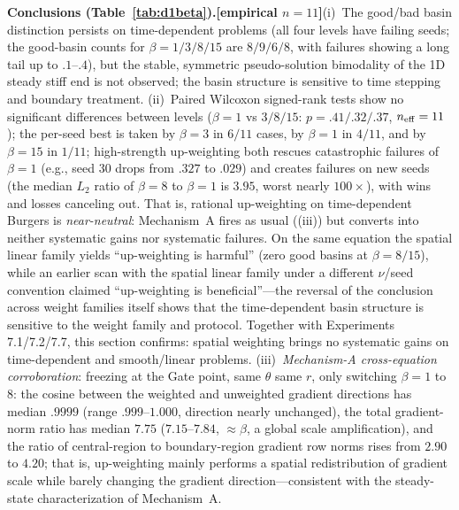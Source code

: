 \documentclass[11pt]{article}
\numberwithin{equation}{section}
\begin{document}
\noindent\textbf{Conclusions (Table~\ref{tab:d1beta}).}\textbf{[empirical $n=11$]}(i)~The good/bad basin distinction persists on time-dependent problems (all four levels have failing seeds; the good-basin counts for $\beta=1/3/8/15$ are $8/9/6/8$, with failures showing a long tail up to $.1$--$.4$), but the stable, symmetric pseudo-solution bimodality of the 1D steady stiff end is not observed; the basin structure is sensitive to time stepping and boundary treatment. (ii)~Paired Wilcoxon signed-rank tests show no significant differences between levels ($\beta=1$ vs $3/8/15$: $p=.41/.32/.37$, $n_{\rm eff}=11$); the per-seed best is taken by $\beta=3$ in $6/11$ cases, by $\beta=1$ in $4/11$, and by $\beta=15$ in $1/11$; high-strength up-weighting both rescues catastrophic failures of $\beta=1$ (e.g., seed 30 drops from $.327$ to $.029$) and creates failures on new seeds (the median $L_2$ ratio of $\beta=8$ to $\beta=1$ is $3.95$, worst nearly $100\times$), with wins and losses canceling out. That is, rational up-weighting on time-dependent Burgers is \emph{near-neutral}: Mechanism~A fires as usual ((iii)) but converts into neither systematic gains nor systematic failures. On the same equation the spatial linear family yields ``up-weighting is harmful'' (zero good basins at $\beta=8/15$), while an earlier scan with the spatial linear family under a different $\nu$/seed convention claimed ``up-weighting is beneficial''---the reversal of the conclusion across weight families itself shows that the time-dependent basin structure is sensitive to the weight family and protocol. Together with Experiments 7.1/7.2/7.7, this section confirms: spatial weighting brings no systematic gains on time-dependent and smooth/linear problems. (iii)~\emph{Mechanism-A cross-equation corroboration}: freezing at the Gate point, same $\theta$ same $r$, only switching $\beta=1$ to $8$: the cosine between the weighted and unweighted gradient directions has median $.9999$ (range $.999$--$1.000$, direction nearly unchanged), the total gradient-norm ratio has median $7.75$ ($7.15$--$7.84$, $\approx\beta$, a global scale amplification), and the ratio of central-region to boundary-region gradient row norms rises from $2.90$ to $4.20$; that is, up-weighting mainly performs a spatial redistribution of gradient scale while barely changing the gradient direction---consistent with the steady-state characterization of Mechanism~A.
\end{document}
